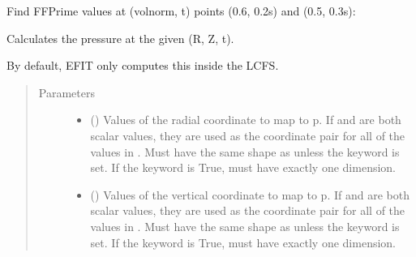 \documentclass[letterpaper,10pt,english]{sphinxmanual}
\begin{document}
\begin{fulllineitems}
\begin{fulllineitems}
Find FFPrime values at (volnorm, t) points (0.6, 0.2s) and (0.5, 0.3s):

\begin{sphinxVerbatim}[commandchars=\\\{\}]
  \PYG{p}{[} \PYG{p}{]} \PYG{p}{[} \PYG{p}{]} 
\end{sphinxVerbatim}

\end{fulllineitems}


\begin{fulllineitems}
\label{\detokenize{eqtools:eqtools.core.Equilibrium.rz2p}}
Calculates the pressure at the given (R, Z, t).

By default, EFIT only computes this inside the LCFS.
\begin{quote}\begin{description}
\item[{Parameters}] \leavevmode\begin{itemize}
\item {} 
 () \textendash{} Values of the radial coordinate to
map to p. If  and  are both scalar values,
they are used as the coordinate pair for all of the values in
. Must have the same shape as  unless the 
keyword is set. If the  keyword is True,  must
have exactly one dimension.

\item {} 
 () \textendash{} Values of the vertical coordinate to
map to p. If  and  are both scalar values,
they are used as the coordinate pair for all of the values in
. Must have the same shape as  unless the 
keyword is set. If the  keyword is True,  must
have exactly one dimension.


\end{itemize}
\end{description}
\end{quote}
\end{fulllineitems}
\end{fulllineitems}
\end{document}
